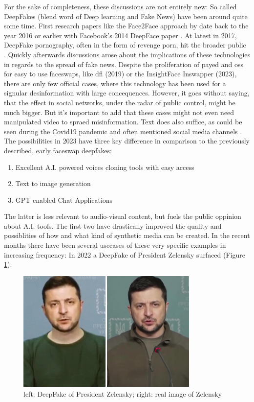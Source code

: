 \documentclass[
  a4paper,  %
  twoside,  %
  bibliography=totoc,
  headsepline,
  cleardoublepage=empty,
  parskip=half,
  draft=false
]{scrbook}
\begin{document}
For the sake of completeness, these discussions are not entirely new: So called DeepFakes (blend word of Deep learning and Fake News) have been around quite some time. First research papers like the Face2Face approach by \citet{thiesFace2FaceRealtimeFace2020} date back to the year 2016 or earlier with Facebook's 2014 DeepFace paper \cite{taigmanDeepFaceClosingGap2014}. At latest in 2017, DeepFake pornography, often in the form of revenge porn, hit the broader public \cite{coleAIAssistedFakePorn2017}. Quickly afterwards discussions arose about the implications of these technologies in regards to the spread of fake news. Despite the proliferation of payed and \gls{oss} for easy to use faceswaps, like \gls{dfl} (2019) or the InsightFace Inswapper (2023), there are only few official cases, where this technology has been used for a signular desinformation with large concequences. However, it goes without saying, that the effect in social networks, under the radar of public control, might be much bigger. But it's important to add that these cases might not even need manipulated video to spraed misinformation. Text does also suffice, as could be seen during the Covid19 pandemic and often mentioned social media channels \cite{naeemExplorationHowFake2021}.  
The possibilities in 2023 have three key difference in comparison to the previously described, early faceswap deepfakes: 
\begin{enumerate}
  \item Excellent A.I. powered voices cloning tools with easy access
  \item Text to image generation
  \item GPT-enabled Chat Applications
\end{enumerate}
The latter is less relevant to audio-visual content, but fuels the public oppinion about A.I. tools. The first two have drastically improved the quality and possiblities of how and what kind of synthetic media can be created. In the recent months there have been several usecases of these very specific examples in increasing frequency: In 2022 a DeepFake of President Zelensky surfaced (Figure \ref{fig:zelensky-deepfake}). 
\begin{figure}[h]
  \centering
  \includegraphics[width=0.8\textwidth]{./graphics/images/Zelensky.jpg}
  \caption{left: DeepFake of President Zelensky; right: real image of Zelensky \cite{universityofvirginiaZelenskyySurrenderHoax2022}}
  \label{fig:zelensky-deepfake}
\end{figure}
\end{document}
